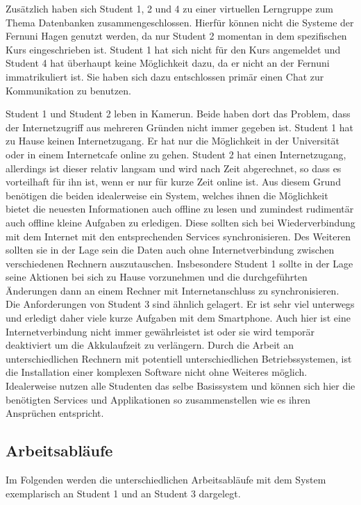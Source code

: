 Zusätzlich haben sich Student 1, 2 und 4 zu einer virtuellen Lerngruppe zum Thema Datenbanken zusammengeschlossen. Hierfür können nicht die Systeme der Fernuni Hagen genutzt werden, da nur Student 2 momentan in dem spezifischen Kurs eingeschrieben ist. Student 1 hat sich nicht für den Kurs angemeldet und Student 4 hat überhaupt keine Möglichkeit dazu, da er nicht an der Fernuni immatrikuliert ist. Sie haben sich dazu entschlossen primär einen Chat zur Kommunikation zu benutzen.

Student 1 und Student 2 leben in Kamerun. Beide haben dort das Problem, dass der Internetzugriff aus mehreren Gründen nicht immer gegeben ist. Student 1 hat zu Hause keinen Internetzugang. Er hat nur die Möglichkeit in der Universität oder in einem Internetcafe online zu gehen. Student 2 hat einen Internetzugang, allerdings ist dieser relativ langsam und wird nach Zeit abgerechnet, so dass es vorteilhaft für ihn ist, wenn er nur für kurze Zeit online ist. Aus diesem Grund benötigen die beiden idealerweise ein System, welches ihnen die Möglichkeit bietet die neuesten Informationen auch offline zu lesen und zumindest rudimentär auch offline kleine Aufgaben zu erledigen. Diese sollten sich bei Wiederverbindung mit dem Internet mit den entsprechenden Services synchronisieren. Des Weiteren sollten sie in der Lage sein die Daten auch ohne Internetverbindung zwischen verschiedenen Rechnern auszutauschen. Insbesondere Student 1 sollte in der Lage seine Aktionen bei sich zu Hause vorzunehmen und die durchgeführten Änderungen dann an einem Rechner mit Internetanschluss zu synchronisieren. Die Anforderungen von Student 3 sind ähnlich gelagert. Er ist sehr viel unterwegs und erledigt daher viele kurze Aufgaben mit dem Smartphone. Auch hier ist eine Internetverbindung nicht immer gewährleistet ist oder sie wird temporär deaktiviert um die Akkulaufzeit zu verlängern. Durch die Arbeit an unterschiedlichen Rechnern mit potentiell unterschiedlichen Betriebssystemen, ist die Installation einer komplexen Software nicht ohne Weiteres möglich.
Idealerweise nutzen alle Studenten das selbe Basissystem und können sich hier die benötigten Services und Applikationen so zusammenstellen wie es ihren Ansprüchen entspricht.

\subsection{Arbeitsabläufe}
Im Folgenden werden die unterschiedlichen Arbeitsabläufe mit dem System exemplarisch an Student 1 und an Student 3 dargelegt.

